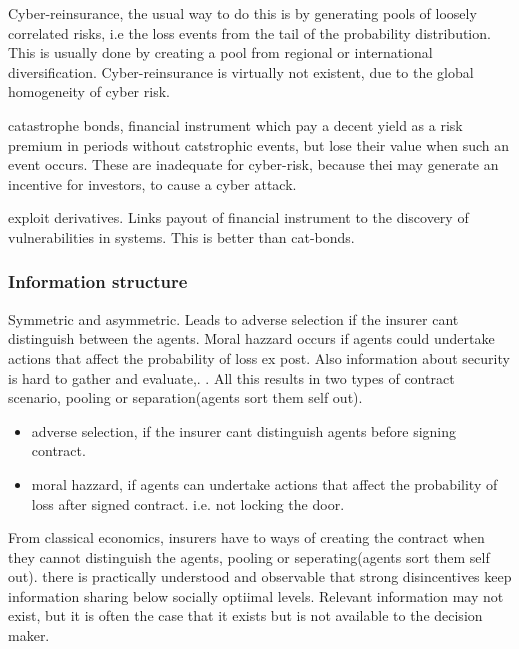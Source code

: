 Cyber-reinsurance, the usual way to do this is by generating pools of loosely correlated risks, i.e the loss events from the tail of the probability distribution. This is usually done by creating a pool from regional or international diversification. Cyber-reinsurance is virtually not existent, due to the global homogeneity of cyber risk. 

catastrophe bonds, financial instrument which pay a decent yield as a risk premium in periods without 
catstrophic events, but lose their value when such an event occurs. 
These are inadequate for cyber-risk, because thei may generate an incentive for investors, 
to cause a cyber attack.

exploit derivatives. Links payout of financial instrument to the discovery of vulnerabilities in systems. This is better than cat-bonds. 
\subsubsection{Information structure}
Symmetric and asymmetric. Leads to adverse selection if the insurer cant distinguish
 between the agents. Moral hazzard occurs if agents could undertake actions that affect
  the probability of loss ex post. Also information about security is hard to gather and
   evaluate,. . All this results in two types of contract scenario, pooling or
    separation(agents sort them self out).
    \begin{itemize}
    \item adverse selection, if the insurer cant distinguish agents before signing contract.
    \item moral hazzard, if agents can undertake actions that affect the probability of loss after signed contract. i.e. not locking the door.
    \end{itemize}
    From classical economics, insurers have to ways of creating the contract when they cannot distinguish the agents, pooling or seperating(agents sort them self out).
    there is practically understood and observable that strong disincentives keep information sharing below socially optiimal levels. Relevant information may not exist, 
    but it is often the case that it exists but is not available to the decision maker.
